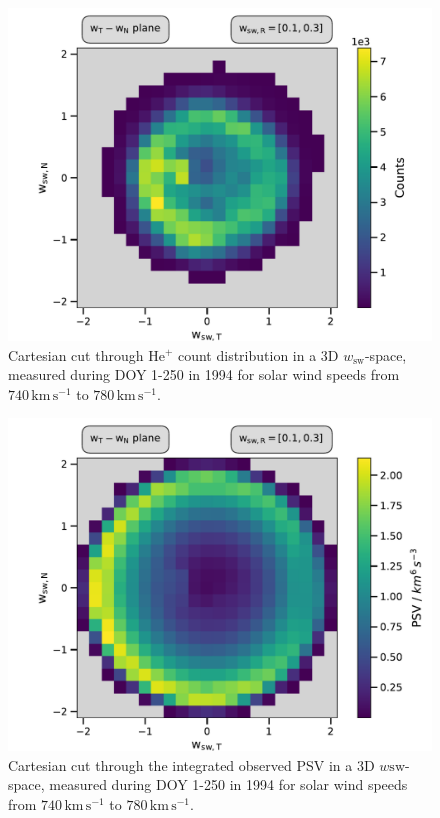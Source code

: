 \begin{figure}[h]
	\includegraphics[width=.85\textwidth]{Figures/cart_long_counts.pdf}
	\centering
	\caption{Cartesian cut through $\mathrm{He^{+}}$ count distribution in a 3D $w_\mathrm{sw}$-space, measured during DOY 1-250 in 1994 for solar wind speeds from $740 \, \mathrm{km\,s^{-1}}$ to $780 \, \mathrm{km\,s^{-1}}$.}
	\label{fig:counts_long}
\end{figure}
\begin{figure}[h]
	\includegraphics[width=.85\textwidth]{Figures/cart_long_norm.pdf}
	\centering
	\caption{Cartesian cut through the integrated observed PSV in a 3D $w\mathrm{sw}$-space, measured during DOY 1-250 in 1994 for solar wind speeds from $740 \, \mathrm{km\,s^{-1}}$ to $780 \, \mathrm{km\,s^{-1}}$.}
	\label{fig:norm_long}
\end{figure}

